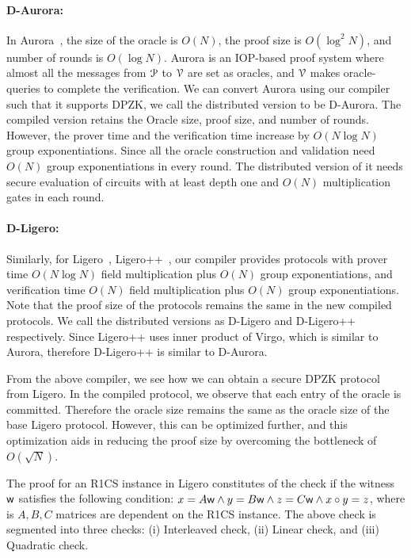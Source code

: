 \paragraph*{D-Aurora:}
In Aurora~\cite{aurora}, the size of the oracle is $O(N)$, the proof size is $O(\log^2 N)$, and number of rounds is $O(\log N)$. Aurora is an IOP-based proof system where almost all the messages from $\mathcal{P}$ to $\mathcal{V}$ are set as oracles, and $\mathcal{V}$ makes oracle-queries to complete the verification.
We can convert Aurora using our compiler such that it supports DPZK, we call the distributed version to be D-Aurora. The compiled version retains the Oracle size, proof size, and number of rounds. However, the prover time and the verification time increase by $O(N\log N)$ group exponentiations. Since all the oracle construction and validation need $O(N)$ group exponentiations in every round. The distributed version of it needs secure evaluation of circuits with at least depth one and $O(N)$ multiplication gates in each round.
\paragraph*{D-Ligero:}
Similarly, for Ligero~\cite{ligero}, Ligero++~\cite{ligero++}, our compiler provides protocols with  prover time $O(N\log N)$ field multiplication plus $O(N)$ group exponentiations, and verification time $O(N)$ field multiplication plus $O(N)$ group exponentiations. Note that the proof size of the protocols remains the same in the new compiled protocols. We call the distributed versions as D-Ligero and D-Ligero++ respectively. Since Ligero++ uses inner product of Virgo, which is similar to Aurora, therefore D-Ligero++ is similar to D-Aurora.

From the above compiler, we see how we can obtain a secure DPZK protocol from Ligero. In the compiled protocol, we observe that each entry of the oracle is committed. Therefore the oracle size remains the same as the oracle size of the base Ligero protocol. However, this can be optimized further, and this optimization aids in reducing the proof size by overcoming the bottleneck of $O(\sqrt{N})$.

The proof for an R1CS instance in Ligero constitutes of the check if the witness $\mathsf{w}$ satisfies the following condition: $x = A \mathsf{w} \land y = B \mathsf{w} \land z = C \mathsf{w} \land x \circ y = z$, where is $A, B, C$ matrices are dependent on the R1CS instance. The above check is segmented into three checks: (i) Interleaved check, (ii) Linear check, and (iii) Quadratic check. 

